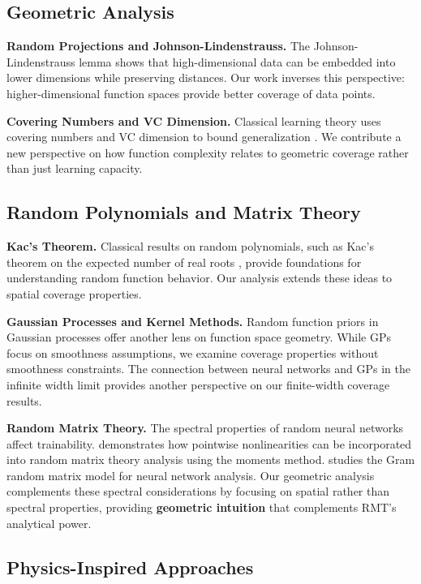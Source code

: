 \subsection{Geometric Analysis}

\textbf{Random Projections and Johnson-Lindenstrauss.} The Johnson-Lindenstrauss lemma shows that high-dimensional data can be embedded into lower dimensions while preserving distances. Our work inverses this perspective: higher-dimensional function spaces provide better coverage of data points.

\textbf{Covering Numbers and VC Dimension.} Classical learning theory uses covering numbers and VC dimension to bound generalization \cite{Vapnik1971ChervonenkisOT}. We contribute a new perspective on how function complexity relates to geometric coverage rather than just learning capacity.

\subsection{Random Polynomials and Matrix Theory}

\textbf{Kac's Theorem.} Classical results on random polynomials, such as Kac's theorem on the expected number of real roots \cite{Kac1943ACT}, provide foundations for understanding random function behavior. Our analysis extends these ideas to spatial coverage properties.

\textbf{Gaussian Processes and Kernel Methods.} Random function priors in Gaussian processes \cite{Neal1995BayesianLF} offer another lens on function space geometry. While GPs focus on smoothness assumptions, we examine coverage properties without smoothness constraints. The connection between neural networks and GPs in the infinite width limit \cite{Matthews2018GaussianPB} provides another perspective on our finite-width coverage results.

\textbf{Random Matrix Theory.} The spectral properties of random neural networks \cite{Pennington2017ResurrectingTS} affect trainability. \cite{Pennington2017NonlinearRandom} demonstrates how pointwise nonlinearities can be incorporated into random matrix theory analysis using the moments method. \cite{Louart2017RandomMatrix} studies the Gram random matrix model for neural network analysis. Our geometric analysis complements these spectral considerations by focusing on spatial rather than spectral properties, providing \textbf{geometric intuition} that complements RMT's analytical power.

\subsection{Physics-Inspired Approaches}

